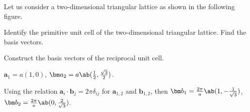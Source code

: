 \begin{wrapstuff}[r, width = .24\linewidth]
  \centering
\end{wrapstuff}
\begin{problem}
  Let us consider a two-dimen\-sional triangular lattice as shown in the
  following figure.
  \wrapstuffclear
  \begin{enumext}
    \item Identify the primitive unit cell of the two-dimensional triangular
    lattice. Find the basis vectors.
    \item Construct the basis vectors of the reciprocal unit cell.
  \end{enumext}
\end{problem}
\begin{solution}\leavevmode
  \begin{enumext}
    \item $\bm a_1 = a(1,0)$, $\bm a_2 = a \ab(\frac12, \frac{\sqrt3}{2})$.
    \item Using the relation $\bm a_i \cdot \bm b_j = 2\pi\delta_{ij}$ for
    $\bm a_{1,2}$ and $\bm b_{1,2}$, then
    $\bm b_1 = \frac{2\pi}a \ab(1, -\frac1{\sqrt3})$,
    $\bm b_2 = \frac{2\pi}a \ab(0, \frac2{\sqrt3})$.
  \end{enumext}
\end{solution}

